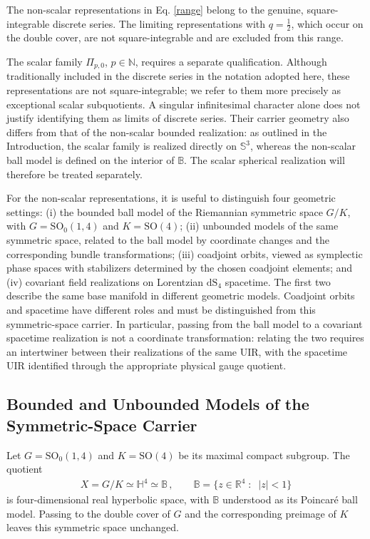 \documentclass{SciPost}
\begin{document}
The non-scalar representations in Eq. \eqref{range} belong to the genuine, square-integrable discrete series. The limiting representations with $q=\frac{1}{2}$, which occur on the double cover, are not square-integrable and are excluded from this range.

The scalar family $\Pi_{p,0}$, $p\in\mathbb{N}$, requires a separate qualification. Although traditionally included in the discrete series in the notation adopted here, these representations are not square-integrable; we refer to them more precisely as exceptional scalar subquotients. A singular infinitesimal character alone does not justify identifying them as limits of discrete series. Their carrier geometry also differs from that of the non-scalar bounded realization: as outlined in the Introduction, the scalar family is realized directly on $\mathbb{S}^{3}$, whereas the non-scalar ball model is defined on the interior of $\mathbb{B}$. The scalar spherical realization will therefore be treated separately.

For the non-scalar representations, it is useful to distinguish four geometric settings: (i) the bounded ball model of the Riemannian symmetric space $G/K$, with $G=\mathrm{SO}_0(1,4)$ and $K=\mathrm{SO}(4)$; (ii) unbounded models of the same symmetric space, related to the ball model by coordinate changes and the corresponding bundle transformations; (iii) coadjoint orbits, viewed as symplectic phase spaces with stabilizers determined by the chosen coadjoint elements; and (iv) covariant field realizations on Lorentzian $\mathrm{dS}_{4}$ spacetime. The first two describe the same base manifold in different geometric models. Coadjoint orbits and spacetime have different roles and must be distinguished from this symmetric-space carrier. In particular, passing from the ball model to a covariant spacetime realization is not a coordinate transformation: relating the two requires an intertwiner between their realizations of the same UIR, with the spacetime UIR identified through the appropriate physical gauge quotient.


\subsection{Bounded and Unbounded Models of the Symmetric-Space Carrier} \label{subsec:compact-realization}

Let $G=\mathrm{SO}_0(1,4)$ and $K=\mathrm{SO}(4)$ be its maximal compact subgroup. The quotient
\begin{align}\label{eq:carrier-geometry}
    X=G/K\simeq\mathbb H^4\simeq\mathbb B
    \,, \qquad
    \mathbb B=\{z\in\mathbb R^4 \;\colon\;\; |z|<1\}
\end{align}
is four-dimensional real hyperbolic space, with $\mathbb B$ understood as its Poincar\'e ball model. Passing to the double cover of $G$ and the corresponding preimage of $K$ leaves this symmetric space unchanged.
\end{document}
